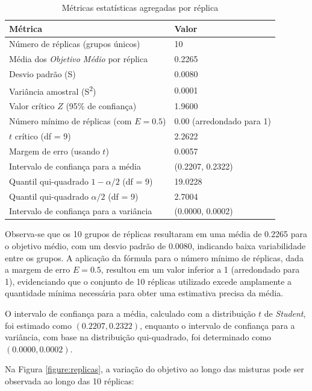 \documentclass[
    12pt,                %
    openright,           %
    oneside,             %
    a4paper,             %
    english,             %
    spanish,             %
    brazil               %
]{ufscar}
\begin{document}
\begin{table}[ht]
\centering
\caption{Métricas estatísticas agregadas por réplica}
\label{tab:resultados}
\begin{tabular}{@{}ll@{}}
\toprule
Métrica & Valor \\ \midrule
Número de réplicas (grupos únicos) & 10 \\
Média dos \emph{Objetivo Médio} por réplica & 0.2265 \\
Desvio padrão (S) & 0.0080 \\
Variância amostral (S\textsuperscript{2}) & 0.0001 \\ \midrule
Valor crítico \(Z\) (95\% de confiança) & 1.9600 \\
Número mínimo de réplicas (com \(E=0.5\)) & 0.00 (arredondado para 1) \\ \midrule
\(t\) crítico (df = 9) & 2.2622 \\
Margem de erro (usando \(t\)) & 0.0057 \\
Intervalo de confiança para a média & (0.2207, 0.2322) \\ \midrule
Quantil qui-quadrado \(1-\alpha/2\) (df = 9) & 19.0228 \\
Quantil qui-quadrado \(\alpha/2\) (df = 9) & 2.7004 \\
Intervalo de confiança para a variância & (0.0000, 0.0002) \\
\bottomrule
\end{tabular}
\end{table}

Observa-se que os 10 grupos de réplicas resultaram em uma média de 0.2265 para o objetivo médio, com um desvio padrão de 0.0080, indicando baixa variabilidade entre os grupos. A aplicação da fórmula para o número mínimo de réplicas, dada a margem de erro \(E = 0.5\), resultou em um valor inferior a 1 (arredondado para 1), evidenciando que o conjunto de 10 réplicas utilizado excede amplamente a quantidade mínima necessária para obter uma estimativa precisa da média.

O intervalo de confiança para a média, calculado com a distribuição \(t\) de \textit{Student}, foi estimado como \((0.2207, 0.2322)\), enquanto o intervalo de confiança para a variância, com base na distribuição qui-quadrado, foi determinado como \((0.0000, 0.0002)\).

Na Figura \ref{figure:replicas}, a variação do objetivo ao longo das misturas pode ser observada ao longo das 10 réplicas:
\end{document}
